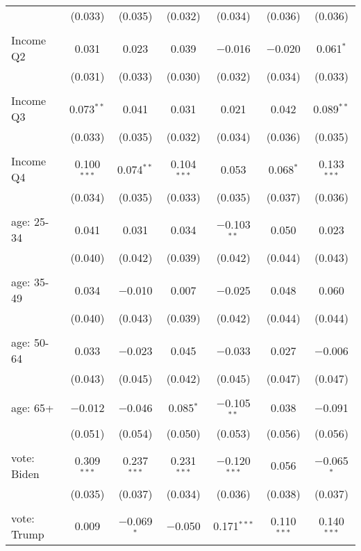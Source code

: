\begin{tabular}{@{\extracolsep{5pt}}lcccccc}
  & (0.033) & (0.035) & (0.032) & (0.034) & (0.036) & (0.036) \\ 
  & & & & & & \\ 
 Income Q2 & 0.031 & 0.023 & 0.039 & $-$0.016 & $-$0.020 & 0.061$^{*}$ \\ 
  & (0.031) & (0.033) & (0.030) & (0.032) & (0.034) & (0.033) \\ 
  & & & & & & \\ 
 Income Q3 & 0.073$^{**}$ & 0.041 & 0.031 & 0.021 & 0.042 & 0.089$^{**}$ \\ 
  & (0.033) & (0.035) & (0.032) & (0.034) & (0.036) & (0.035) \\ 
  & & & & & & \\ 
 Income Q4 & 0.100$^{***}$ & 0.074$^{**}$ & 0.104$^{***}$ & 0.053 & 0.068$^{*}$ & 0.133$^{***}$ \\ 
  & (0.034) & (0.035) & (0.033) & (0.035) & (0.037) & (0.036) \\ 
  & & & & & & \\ 
 age: 25-34 & 0.041 & 0.031 & 0.034 & $-$0.103$^{**}$ & 0.050 & 0.023 \\ 
  & (0.040) & (0.042) & (0.039) & (0.042) & (0.044) & (0.043) \\ 
  & & & & & & \\ 
 age: 35-49 & 0.034 & $-$0.010 & 0.007 & $-$0.025 & 0.048 & 0.060 \\ 
  & (0.040) & (0.043) & (0.039) & (0.042) & (0.044) & (0.044) \\ 
  & & & & & & \\ 
 age: 50-64 & 0.033 & $-$0.023 & 0.045 & $-$0.033 & 0.027 & $-$0.006 \\ 
  & (0.043) & (0.045) & (0.042) & (0.045) & (0.047) & (0.047) \\ 
  & & & & & & \\ 
 age: 65+ & $-$0.012 & $-$0.046 & 0.085$^{*}$ & $-$0.105$^{**}$ & 0.038 & $-$0.091 \\ 
  & (0.051) & (0.054) & (0.050) & (0.053) & (0.056) & (0.056) \\ 
  & & & & & & \\ 
 vote: Biden & 0.309$^{***}$ & 0.237$^{***}$ & 0.231$^{***}$ & $-$0.120$^{***}$ & 0.056 & $-$0.065$^{*}$ \\ 
  & (0.035) & (0.037) & (0.034) & (0.036) & (0.038) & (0.037) \\ 
  & & & & & & \\ 
 vote: Trump & 0.009 & $-$0.069$^{*}$ & $-$0.050 & 0.171$^{***}$ & 0.110$^{***}$ & 0.140$^{***}$ \\ 

\end{tabular}
